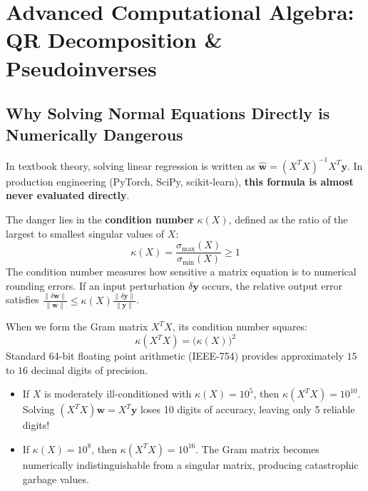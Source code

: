 \section{Advanced Computational Algebra: QR Decomposition \& Pseudoinverses}

\subsection{Why Solving Normal Equations Directly is Numerically Dangerous}
In textbook theory, solving linear regression is written as $\hat{\mathbf{w}} = (X^T X)^{-1} X^T \mathbf{y}$. In production engineering (PyTorch, SciPy, scikit-learn), \textbf{this formula is almost never evaluated directly}.

The danger lies in the \textbf{condition number} $\kappa(X)$, defined as the ratio of the largest to smallest singular values of $X$:
\begin{equation}
\kappa(X) = \frac{\sigma_{\max}(X)}{\sigma_{\min}(X)} \ge 1
\end{equation}
The condition number measures how sensitive a matrix equation is to numerical rounding errors. If an input perturbation $\delta \mathbf{y}$ occurs, the relative output error satisfies $\frac{\|\delta \mathbf{w}\|}{\|\mathbf{w}\|} \le \kappa(X) \frac{\|\delta \mathbf{y}\|}{\|\mathbf{y}\|}$.

When we form the Gram matrix $X^T X$, its condition number squares:
\begin{equation}
\kappa(X^T X) = \big( \kappa(X) \big)^2
\label{eq:cond_squaring}
\end{equation}
Standard 64-bit floating point arithmetic (IEEE-754) provides approximately $15$ to $16$ decimal digits of precision.
\begin{itemize}
    \item If $X$ is moderately ill-conditioned with $\kappa(X) = 10^5$, then $\kappa(X^T X) = 10^{10}$. Solving $(X^T X)\mathbf{w} = X^T \mathbf{y}$ loses 10 digits of accuracy, leaving only 5 reliable digits!
    \item If $\kappa(X) = 10^8$, then $\kappa(X^T X) = 10^{16}$. The Gram matrix becomes numerically indistinguishable from a singular matrix, producing catastrophic garbage values.
\end{itemize}

